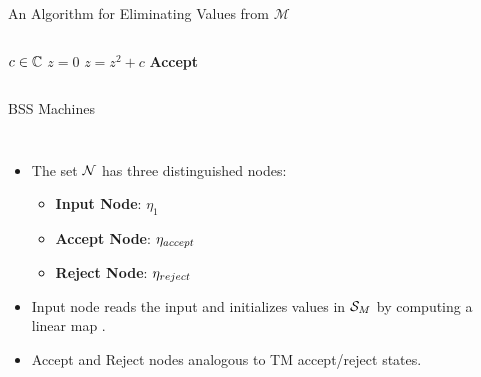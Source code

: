 \documentclass[c]{beamer}
\begin{document}
\begin{frame}{An Algorithm for Eliminating Values from $\mathcal{M}$}

  \begin{columns}
    \begin{algorithmic}
      \Require $c \in \mathbb{C}$
      \State $z = 0$
      \State $z = z^2 +c$
      \EndWhile
      \State \textbf{Accept}
    \end{algorithmic}

    \begin{center}
      \scaletopagewidth[0.9]{\mandelrecsimple{}}
    \end{center}
  \end{columns}
\end{frame}

\begin{frame}{BSS Machines}
  \begin{columns}
    
    \begin{itemize}
    \item The set $\mathcal{N}$ has three distinguished nodes:
      \begin{itemize}
      \item \textbf{Input Node}: $\eta_1$
      \item \textbf{Accept Node}: $\eta_{accept}$
      \item \textbf{Reject Node}: $\eta_{reject}$
      \end{itemize}
    \item Input node reads the input and initializes values in
      $\mathcal{S}_M$ by computing a linear map
      .
    \item Accept and Reject nodes analogous to TM accept/reject
      states.
    \end{itemize}
    \begin{center}
      \scaletopagewidth[.9]{\mandelrecpI{}}
    \end{center}
  \end{columns}

\end{frame}
\end{document}
